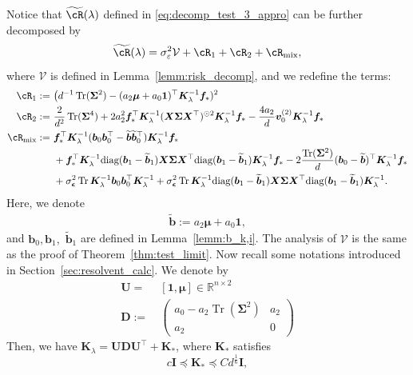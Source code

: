 \documentclass[twoside,11pt]{article}
\newcommand{\bepsilon}{\boldsymbol{\epsilon}}
\newcommand{\R}{\mathbb{R}}
\def\bI{{\mathbf I}}
\newcommand{\diag}{\text{diag}}
\def\bD{{\boldsymbol D}}
\def\vf{{\boldsymbol f}}
\def\bK{{\boldsymbol K}}
\def\bU{{\boldsymbol U}}
\def\bX{{\boldsymbol X}}
\def\bb{{\boldsymbol b}}
\def\bv{{\boldsymbol v}}
\def\bSigma{{\boldsymbol \Sigma}}
\def\cV{{\mathcal V}}
\def\cV{{\mathcal V}}
\renewcommand{\bK}{\boldsymbol{K}}
\newcommand{\Tr}{\operatorname{Tr}}
\newcommand{\vmu}{\mbi{\mu}}
\newcommand{\mix}{\textnormal{mix}}
\newcommand{\1}{\mathbf{1}}
\def\mbi#1{\boldsymbol{#1}}
\def\mbi#1{\boldsymbol{#1}} %
\begin{document}
Notice that $\widetilde\cR(\lambda)$ defined in \eqref{eq:decomp_test_3_appro} can be further decomposed by 
\begin{equation}\label{eq:decomp_test_3_appro_decomp}
    \widetilde\cR(\lambda) = \sigma_\varepsilon^2\cV+\cR_1+\cR_2 +\cR_{\mix},
\end{equation}  
where $\cV$ is defined in Lemma~\ref{lemm:risk_decomp}, and we redefine the terms:
\begin{align}
\cR_1:=~& \big(d^{-1}\Tr(\bSigma^2)-(a_2\vmu+a_0\1)^\top\bK_{\lambda}^{-1} \vf_*)^2\label{eq:bias1_deterministic}\\
\cR_2:=~& \frac{2}{d^2}\Tr( \bSigma^4) + 2a_2^2\vf_*^\top \bK_{\lambda}^{-1}(\bX\bSigma\bX^\top)^{\odot 2}\bK_{\lambda}^{-1} \vf_*-\frac{4a_2}{d}\bv_0^{(2)}\bK_{\lambda}^{-1} \vf_* \label{eq:bias_deterministic}\\
\cR_{\mix}:=~&   \vf_*^\top \bK_{\lambda}^{-1}(\bb_0\bb_0^\top-\widetilde\bb\widetilde\bb_0^\top)\bK_{\lambda}^{-1} \vf_*\\
~&+\vf_*^\top \bK_{\lambda}^{-1}\diag(\bb_1-\widetilde\bb_1)\bX\bSigma\bX^\top\diag(\bb_1-\widetilde\bb_1)\bK_{\lambda}^{-1} \vf_* -2\frac{\Tr( \bSigma^2)}{d}(\bb_0-\widetilde\bb )^\top\bK_{\lambda}^{-1} \vf_*\\
~&+\sigma^2_{\bepsilon}\Tr\bK_{\lambda}^{-1}\bb_0\bb_0^\top\bK_{\lambda}^{-1}+\sigma^2_{\bepsilon}\Tr\bK_{\lambda}^{-1}\diag(\bb_1-\widetilde\bb_1)\bX\bSigma\bX^\top\diag(\bb_1-\widetilde\bb_1)\bK_{\lambda}^{-1}.\label{eq:bias2_deterministic}
\end{align}
Here, we denote \begin{align}\label{eq:def_tilde_b}
\widetilde\bb:=a_2\vmu+a_0\1,
\end{align}
and $ \bb_0, \bb_1,$  $\widetilde\bb_1$ are defined in Lemma~\ref{lemm:b_k,i}.
The analysis of $\cV$ is the same as the proof of Theorem~\ref{thm:test_limit}. Now recall some notations introduced in Section~\ref{sec:resolvent_calc}. We denote by
\begin{align}
    \bU=~&[\1,\vmu]\in\R^{n\times 2}\label{def:U}\\
    \bD:=~& \begin{pmatrix}
        a_0-a_2 \Tr(\bSigma^2) & a_2 \\
        a_2 & 0
    \end{pmatrix}\label{def:D}
\end{align}
Then, we have 
$
    \bK_{\lambda } = \bU\bD\bU^\top+\bK_*$,
where $\bK_*$ satisfies
\begin{equation}\label{eq:bound_K_*}
    c\bI \preccurlyeq\bK_*\preccurlyeq Cd^{\frac{1}{6}}\bI,
\end{equation}
\end{document}
